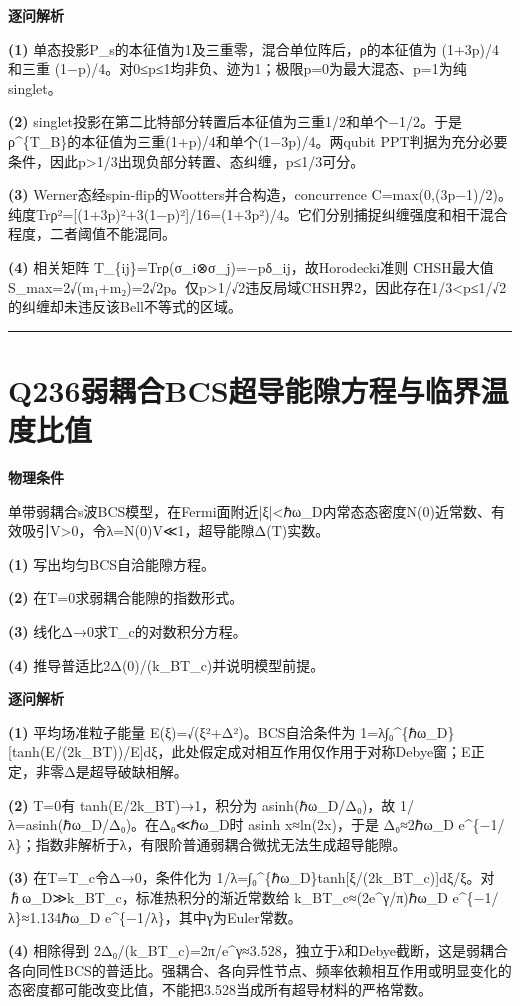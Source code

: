 \documentclass[UTF8,a4paper,11pt,oneside,openany]{ctexbook}
\begin{document}
\par\medskip\noindent\textbf{逐问解析}
\par\noindent\textbf{(1)} 单态投影P\_s的本征值为1及三重零，混合单位阵后，ρ的本征值为 (1+3p)/4 和三重 (1−p)/4。对0≤p≤1均非负、迹为1；极限p=0为最大混态、p=1为纯singlet。
\par\noindent\textbf{(2)} singlet投影在第二比特部分转置后本征值为三重1/2和单个−1/2。于是ρ\textasciicircum{}\{T\_B\}的本征值为三重(1+p)/4和单个(1−3p)/4。两qubit PPT判据为充分必要条件，因此p>1/3出现负部分转置、态纠缠，p≤1/3可分。
\par\noindent\textbf{(3)} Werner态经spin-flip的Wootters并合构造，concurrence C=max(0,(3p−1)/2)。纯度Trρ²=[(1+3p)²+3(1−p)²]/16=(1+3p²)/4。它们分别捕捉纠缠强度和相干混合程度，二者阈值不能混同。
\par\noindent\textbf{(4)} 相关矩阵 T\_\{ij\}=Trρ(σ\_i⊗σ\_j)=−pδ\_ij，故Horodecki准则 CHSH最大值 S\_max=2√(m₁+m₂)=2√2p。仅p>1/√2违反局域CHSH界2，因此存在1/3<p≤1/√2的纠缠却未违反该Bell不等式的区域。

\par\bigskip\hrule\bigskip
\section*{Q236\quad 弱耦合BCS超导能隙方程与临界温度比值}
\textbf{物理条件}\par 单带弱耦合s波BCS模型，在Fermi面附近|ξ|<ℏω\_D内常态态密度N(0)近常数、有效吸引V>0，令λ=N(0)V≪1，超导能隙Δ(T)实数。
\par\noindent\textbf{(1)} 写出均匀BCS自洽能隙方程。
\par\noindent\textbf{(2)} 在T=0求弱耦合能隙的指数形式。
\par\noindent\textbf{(3)} 线化Δ→0求T\_c的对数积分方程。
\par\noindent\textbf{(4)} 推导普适比2Δ(0)/(k\_BT\_c)并说明模型前提。

\par\medskip\noindent\textbf{逐问解析}
\par\noindent\textbf{(1)} 平均场准粒子能量 E(ξ)=√(ξ²+Δ²)。BCS自洽条件为 1=λ∫₀\textasciicircum{}\{ℏω\_D\}[tanh(E/(2k\_BT))/E]dξ，此处假定成对相互作用仅作用于对称Debye窗；E正定，非零Δ是超导破缺相解。
\par\noindent\textbf{(2)} T=0有 tanh(E/2k\_BT)→1，积分为 asinh(ℏω\_D/Δ₀)，故 1/λ=asinh(ℏω\_D/Δ₀)。在Δ₀≪ℏω\_D时 asinh x≈ln(2x)，于是 Δ₀≈2ℏω\_D e\textasciicircum{}\{−1/λ\}；指数非解析于λ，有限阶普通弱耦合微扰无法生成超导能隙。
\par\noindent\textbf{(3)} 在T=T\_c令Δ→0，条件化为 1/λ=∫₀\textasciicircum{}\{ℏω\_D\}tanh[ξ/(2k\_BT\_c)]dξ/ξ。对ℏω\_D≫k\_BT\_c，标准热积分的渐近常数给 k\_BT\_c≈(2e\textasciicircum{}γ/π)ℏω\_D e\textasciicircum{}\{−1/λ\}≈1.134ℏω\_D e\textasciicircum{}\{−1/λ\}，其中γ为Euler常数。
\par\noindent\textbf{(4)} 相除得到 2Δ₀/(k\_BT\_c)=2π/e\textasciicircum{}γ≈3.528，独立于λ和Debye截断，这是弱耦合各向同性BCS的普适比。强耦合、各向异性节点、频率依赖相互作用或明显变化的态密度都可能改变比值，不能把3.528当成所有超导材料的严格常数。
\end{document}
